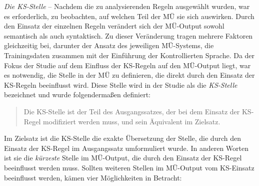 


\medskip
\textit{Die KS-Stelle} -- Nachdem die zu analysierenden Regeln ausgewählt wurden, war es erforderlich, zu beobachten, auf welchen Teil der MÜ sie sich auswirken. Durch den Einsatz der einzelnen Regeln verändert sich der MÜ-Output sowohl semantisch als auch syntaktisch. Zu dieser Veränderung tragen mehrere Faktoren gleichzeitig bei, darunter der Ansatz des jeweiligen MÜ-Systems, die Trainingsdaten zusammen mit der Einführung der Kontrollierten Sprache. Da der Fokus der Studie auf dem Einfluss der KS-Regeln auf den MÜ-Output liegt, war es notwendig, die Stelle in der MÜ zu definieren, die direkt durch den Einsatz der KS-Regeln beeinflusst wird. Diese Stelle wird in der Studie als die \textit{KS-Stelle} bezeichnet und wurde folgendermaßen definiert:
\begin{quote}
Die KS-Stelle ist der Teil des Ausgangssatzes, der bei dem Einsatz der KS-Regel modifiziert werden muss, und sein Äquivalent im Zielsatz.
\end{quote}
Im Zielsatz ist die KS-Stelle die exakte Übersetzung der Stelle, die durch den Einsatz der KS-Regel im Ausgangssatz umformuliert wurde. In anderen Worten ist sie die \textit{kürzeste} Stelle im MÜ-Output, die durch den Einsatz der KS-Regel beeinflusst werden muss. Sollten weiteren Stellen im MÜ-Output vom KS-Einsatz beeinflusst werden, kämen vier Möglichkeiten in Betracht:

